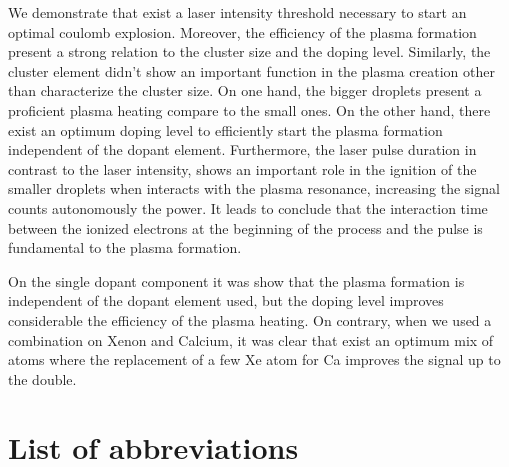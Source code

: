 \documentclass[a4paper,12pt,bibtotocnumbered, twosite]{scrreprt}
\begin{document}
We demonstrate that exist a laser intensity threshold necessary to start an optimal coulomb explosion. Moreover, the efficiency of the plasma formation present a strong relation to the cluster size and the doping level. Similarly, the cluster element didn't show an important function in the plasma creation other than characterize the cluster size. On one hand, the bigger droplets present a proficient plasma heating compare to the small ones. On the other hand, there exist an optimum doping level to efficiently start the plasma formation independent of the dopant element. Furthermore, the laser pulse duration in contrast to the laser intensity, shows an important role in the ignition of the smaller droplets when interacts with the plasma resonance, increasing the signal counts autonomously the power. It leads to conclude that the interaction time between  the ionized electrons at the beginning of the process and the pulse is fundamental to the plasma formation.

On the single dopant component it was show that the plasma  formation is independent of the dopant element used, but the doping level improves considerable the efficiency of the plasma heating. On contrary, when we used a combination on Xenon and Calcium, it was clear that exist an optimum mix of atoms where the replacement of a few Xe atom for Ca improves the signal up to the double.
\newpage

\tableofcontents
\chapter*{List of abbreviations}
\begin{acronym}[DARAM]

  
\end{acronym}
\cleardoublepage{}
\end{document}

